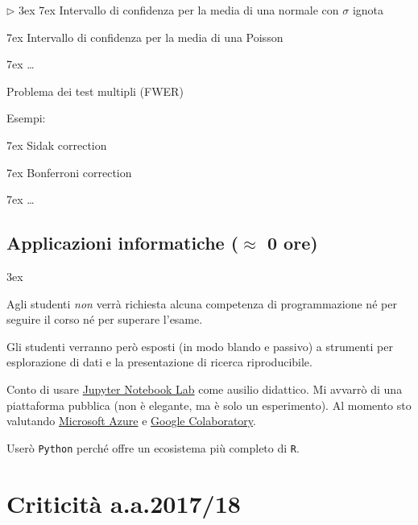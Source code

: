 \documentclass[10pt]{article}
\newcommand{\mylabel}[1]{#1\hfill}
\renewenvironment{itemize}
  {\begin{list}{$\triangleright$}{%
   \baselineskip3ex
   \setlength{\parskip}{4mm}
   \setlength{\topsep}{.4\baselineskip}
   \setlength{\rightmargin}{0mm}
   \setlength{\listparindent}{0mm}
   \setlength{\itemindent}{0mm}
   \setlength{\labelwidth}{2ex}
   \setlength{\itemsep}{.4\baselineskip}
   \setlength{\parsep}{0mm}
   \setlength{\partopsep}{0mm}
   \setlength{\labelsep}{1ex}
   \setlength{\leftmargin}{\labelwidth+\labelsep}
   \let\makelabel\mylabel}}{%
   \end{list}\vspace*{-1.3mm}}
\begin{document}
\begin{itemize}
  \noindent\kern7ex Intervallo di confidenza per la media di una normale con $\sigma$ ignota
  
  \noindent\kern7ex Intervallo di confidenza per la media di una Poisson

  \noindent\kern7ex \ldots\hfill{} 
  
  
\item Problema dei test multipli (FWER)\hfill{} 

Esempi:
  
  \noindent\kern7ex Sidak correction

  \noindent\kern7ex Bonferroni correction
  
  \noindent\kern7ex \ldots\hfill{} 

\end{itemize}


\clearpage
\subsection{Applicazioni informatiche (\boldmath$\approx$ 0 ore)}
\baselineskip3ex

Agli studenti \textit{non\/} verrà richiesta alcuna competenza di programmazione né per seguire il corso né per superare l'esame. 

Gli studenti verranno però esposti (in modo blando e passivo) a strumenti per esplorazione di dati e la presentazione di ricerca riproducibile.

Conto di usare \href{http://jupyter.org}{Jupyter Notebook Lab} come ausilio didattico. Mi avvarrò di una piattaforma pubblica (non è elegante, ma è solo un esperimento). Al momento sto valutando \href{https://notebooks.azure.com/help/jupyter-notebooks}{Microsoft Azure} e \href{https://colab.research.google.com}{Google Colaboratory}.

Userò {\tt Python\/} perché offre un ecosistema più completo di {\tt R}.%



\clearpage
\section{Criticità a.a.\@ 2017/18}
\end{document}
